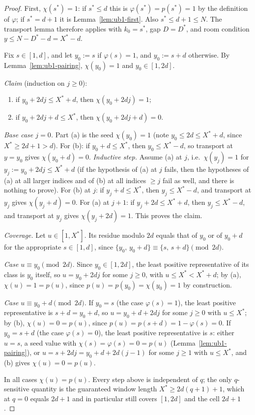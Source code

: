 \begin{proof}
First, $\chi(s^{*}) = 1$: if $s^{*} \le d$ this is
$\varphi(s^{*}) = p(s^{*}) = 1$ by the definition of $\varphi$; if
$s^{*} = d + 1$ it is Lemma~\ref{lem:ub1-first}. Also
$s^{*} \le d + 1 \le N$. The transport lemma therefore applies with
$k_0 = s^{*}$, gap $D = D^{*}$, and room condition
$y \le N - D^{*} - d = X^{*} - d$.

Fix $s \in [1,d]$, and let $y_0 := s$ if $\varphi(s) = 1$, and
$y_0 := s + d$ otherwise. By Lemma~\ref{lem:ub1-pairing}, $\chi(y_0) = 1$
and $y_0 \in [1, 2d]$.

\emph{Claim} (induction on $j \ge 0$):
\begin{enumerate}
\item[(a)] if $y_0 + 2dj \le X^{*} + d$, then $\chi(y_0 + 2dj) = 1$;
\item[(b)] if $y_0 + 2dj + d \le X^{*}$, then $\chi(y_0 + 2dj + d) = 0$.
\end{enumerate}
\emph{Base case $j = 0$.} Part (a) is the seed $\chi(y_0) = 1$ (note
$y_0 \le 2d \le X^{*} + d$, since $X^{*} \ge 2d + 1 > d$). For (b): if
$y_0 + d \le X^{*}$, then $y_0 \le X^{*} - d$, so transport at $y = y_0$
gives $\chi(y_0 + d) = 0$. \emph{Inductive step.} Assume (a) at $j$, i.e.\
$\chi(y_j) = 1$ for $y_j := y_0 + 2dj \le X^{*} + d$ (if the hypothesis of
(a) at $j$ fails, then the hypotheses of (a) at all larger indices and of
(b) at all indices $\ge j$ fail as well, and there is nothing to prove).
For (b) at $j$: if $y_j + d \le X^{*}$, then $y_j \le X^{*} - d$, and
transport at $y_j$ gives $\chi(y_j + d) = 0$. For (a) at $j+1$: if
$y_j + 2d \le X^{*} + d$, then $y_j \le X^{*} - d$, and transport at $y_j$
gives $\chi(y_j + 2d) = 1$. This proves the claim.

\emph{Coverage.} Let $u \in [1, X^{*}]$. Its residue modulo $2d$ equals
that of $y_0$ or of $y_0 + d$ for the appropriate $s \in [1,d]$, since
$\{y_0,\, y_0 + d\} \equiv \{s,\, s + d\} \pmod{2d}$.

\emph{Case $u \equiv y_0 \pmod{2d}$.} Since $y_0 \in [1, 2d]$, the least
positive representative of its class is $y_0$ itself, so
$u = y_0 + 2dj$ for some $j \ge 0$, with $u \le X^{*} < X^{*} + d$; by (a),
$\chi(u) = 1 = p(u)$, since $p(u) = p(y_0) = \chi(y_0) = 1$ by
construction.

\emph{Case $u \equiv y_0 + d \pmod{2d}$.} If $y_0 = s$ (the case
$\varphi(s) = 1$), the least positive representative is $s + d = y_0 + d$,
so $u = y_0 + d + 2dj$ for some $j \ge 0$ with $u \le X^{*}$; by (b),
$\chi(u) = 0 = p(u)$, since $p(u) = p(s + d) = 1 - \varphi(s) = 0$. If
$y_0 = s + d$ (the case $\varphi(s) = 0$), the least positive
representative is $s$: either $u = s$, a seed value with
$\chi(s) = \varphi(s) = 0 = p(u)$ (Lemma~\ref{lem:ub1-pairing}), or
$u = s + 2dj = y_0 + d + 2d(j-1)$ for some $j \ge 1$ with $u \le X^{*}$,
and (b) gives $\chi(u) = 0 = p(u)$.

In all cases $\chi(u) = p(u)$. Every step above is independent of $q$; the
only $q$-sensitive quantity is the guaranteed window length
$X^{*} \ge 2d(q+1) + 1$, which at $q = 0$ equals $2d + 1$ and in particular
still covers $[1, 2d]$ and the cell $2d + 1$.
\end{proof}

